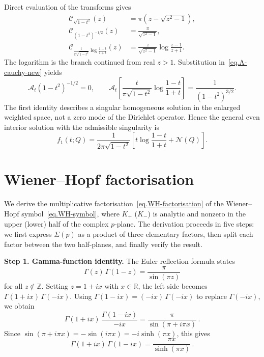\documentclass[11pt,a4paper]{article}
\theoremstyle{definition}
\begin{document}
Direct evaluation of the transforms gives
\begin{align}
 \mathscr C_{\sqrt{1-t^2}}(z)
   &=\pi\left(z-\sqrt{z^2-1}\right),\nonumber\\
 \mathscr C_{(1-t^2)^{-1/2}}(z)
   &=\frac{\pi}{\sqrt{z^2-1}},\label{eq.three-transforms-new}\\
 \mathscr C_{\frac{t}{\pi\sqrt{1-t^2}}
             \log\frac{1-t}{1+t}}(z)
   &=\frac{z}{\sqrt{z^2-1}}\log\frac{z-1}{z+1}.
\end{align}
The logarithm is the branch continued from real $z>1$.  Substitution
in~\eqref{eq.A-cauchy-new} yields
\begin{equation}\label{eq.homogeneous-new}
  \mathcal A_t(1-t^2)^{-1/2}=0,
  \qquad
  \mathcal A_t\left[
  \frac{t}{\pi\sqrt{1-t^2}}\log\frac{1-t}{1+t}\right]
  =\frac{1}{(1-t^2)^{3/2}}.
\end{equation}
The first identity describes a singular homogeneous solution in the enlarged
weighted space, not a zero mode of the Dirichlet operator.  Hence the general
even interior solution with the admissible singularity is
\begin{equation}\label{eq.f1-general-new}
  f_1(t;Q)=\frac{1}{2\pi\sqrt{1-t^2}}
  \left[t\log\frac{1-t}{1+t}+\mathcal N(Q)\right].
\end{equation}

\section{Wiener--Hopf factorisation}
\label{app.wienerhopf}

We derive the multiplicative factorisation~\eqref{eq.WH-factorisation} of the
Wiener--Hopf symbol~\eqref{eq.WH-symbol}, where $K_+$ ($K_-$) is analytic and
nonzero in the upper (lower) half of the complex $p$-plane.  The derivation
proceeds in five steps: we first express
$\Sigma(p)$ as a product of three elementary factors, then split each factor
between the two half-planes, and finally verify the result.

\medskip
\noindent\textbf{Step 1.  Gamma-function identity.}
The Euler reflection formula states
\begin{equation}\label{eq.reflection}
  \Gamma(z)\,\Gamma(1 - z) = \frac{\pi}{\sin(\pi z)}
\end{equation}
for all $z \notin \mathbb{Z}$.  Setting $z = 1 + ix$ with $x \in \mathbb{R}$, the left side becomes
$\Gamma(1 + ix)\,\Gamma(-ix)$.  Using $\Gamma(1 - ix) = (-ix)\,\Gamma(-ix)$
to replace $\Gamma(-ix)$, we obtain
\begin{equation}
  \Gamma(1 + ix)\,\frac{\Gamma(1 - ix)}{-ix}
  = \frac{\pi}{\sin(\pi + i\pi x)}\,.
\end{equation}
Since $\sin(\pi + i\pi x) = -\sin(i\pi x) = -i\sinh(\pi x)$, this gives
\begin{equation}\label{eq.gamma-reflection-result}
  \Gamma(1 + ix)\,\Gamma(1 - ix) = \frac{\pi x}{\sinh(\pi x)}\,.
\end{equation}
\end{document}
